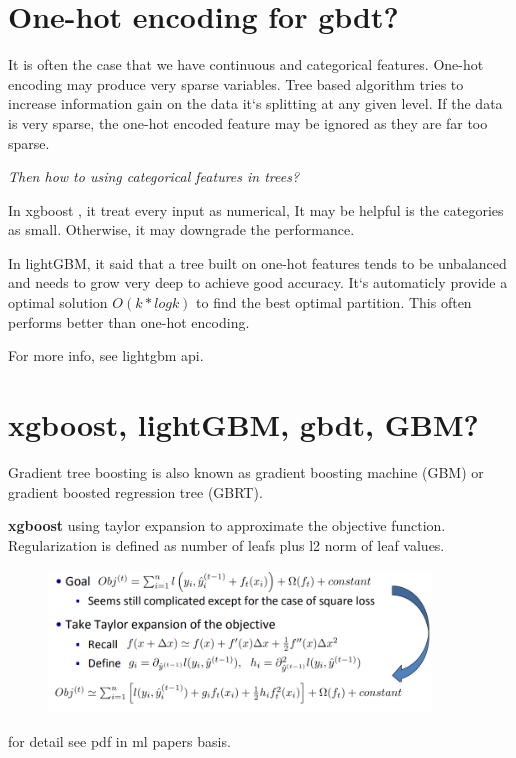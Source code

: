 \documentclass{article}
\begin{document}
\begin{CJK*}{UTF8}{gbsn}
\section{One-hot encoding for gbdt?}

It is often the case that we have continuous and categorical features. One-hot encoding may produce very sparse variables. Tree based algorithm tries to increase information gain on the data it`s splitting at any given level. If the data is very sparse, the one-hot encoded feature may be ignored as they are far too sparse. 

\textit{Then how to using categorical features  in trees?} 

In xgboost \cite{DBLP:conf/kdd/ChenG16}, it treat every input as numerical, It may be helpful is the categories as small. Otherwise, it may downgrade the performance. 

In lightGBM, it said that a tree built on one-hot features tends to be unbalanced and needs to grow very deep to achieve good accuracy. It`s automaticly provide a optimal solution $O(k*logk)$ to find the best optimal partition. This often performs better than one-hot encoding. 

For more info, see lightgbm api.

\section{xgboost, lightGBM, gbdt, GBM?}

Gradient tree boosting is also known as gradient boosting machine (GBM) or gradient boosted regression tree (GBRT). 

\textbf{xgboost} using taylor expansion to approximate the objective function. Regularization is defined as number of leafs plus l2 norm of leaf values.
 
\begin{figure}[H]
\centering
\includegraphics[width=4in,height=1.5in]{taylor}
\caption{}
\end{figure}

for detail see pdf in ml papers basis.


\end{CJK*}
\end{document}
